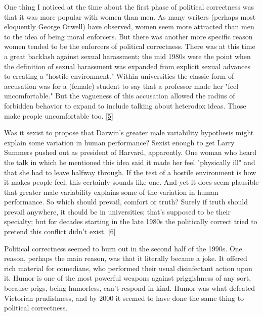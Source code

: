 One thing I noticed
                  at the time about the first phase of political correctness was
                  that it was more popular with women than men. As many writers
                  (perhaps most eloquently George Orwell) have observed, women
                  seem more attracted than men to the idea of being moral
                  enforcers. But there was another more specific reason women
                  tended to be the enforcers of political correctness. There was
                  at this time a great backlash against sexual harassment; the
                  mid 1980s were the point when the definition of sexual
                  harassment was expanded from explicit sexual advances to
                  creating a "hostile environment." Within universities the
                  classic form of accusation was for a (female) student to say
                  that a professor made her "feel uncomfortable." But the
                  vagueness of this accusation allowed the radius of forbidden
                  behavior to expand to include talking about heterodox ideas.
                  Those make people uncomfortable too.
                  [\href{\#f5n}{5}]

Was it sexist to propose that Darwin's greater
                  male variability hypothesis might explain some variation in
                  human performance? Sexist enough to get Larry Summers pushed
                  out as president of Harvard, apparently. One woman who heard
                  the talk in which he mentioned this idea said it made her feel
                  "physically ill" and that she had to leave halfway through. If
                  the test of a hostile environment is how it makes people feel,
                  this certainly sounds like one. And yet it does seem plausible
                  that greater male variability explains some of the variation
                  in human performance. So which should prevail, comfort or
                  truth? Surely if truth should prevail anywhere, it should be
                  in universities; that's supposed to be their specialty; but
                  for decades starting in the late 1980s the politically correct
                  tried to pretend this conflict didn't exist.
                  [\href{\#f6n}{6}]

Political correctness seemed to burn out in the
                  second half of the 1990s. One reason, perhaps the main reason,
                  was that it literally became a joke. It offered rich material
                  for comedians, who performed their usual disinfectant action
                  upon it. Humor is one of the most powerful weapons against
                  priggishness of any sort, because prigs, being humorless,
                  can't respond in kind. Humor was what defeated Victorian
                  prudishness, and by 2000 it seemed to have done the same thing
                  to political correctness.


